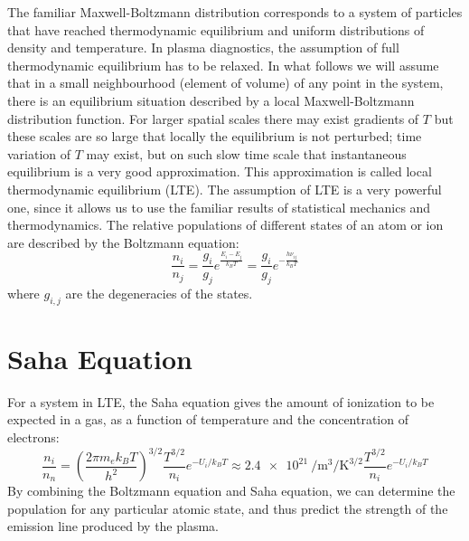 \documentclass[nofonts]{tufte-book}
\begin{document}
The familiar Maxwell-Boltzmann distribution corresponds to a system of particles that have reached thermodynamic equilibrium and uniform distributions of density and temperature. In plasma diagnostics, the assumption of full thermodynamic equilibrium has to be relaxed. In what follows we will assume that in a small neighbourhood (element of volume) of any point in the system, there is an equilibrium situation described by a local Maxwell-Boltzmann distribution function. For larger spatial scales there may exist gradients of $T$ but these scales are so large that locally the equilibrium is not perturbed; time variation of $T$ may exist, but on such slow time scale that instantaneous equilibrium is a very good approximation. This approximation is  called local thermodynamic equilibrium (LTE). The assumption of LTE is a very powerful one, since it allows us to use the familiar results of statistical mechanics and thermodynamics. The relative populations of different states of an atom or ion are described by the Boltzmann equation:
\begin{equation}
		\frac{n_i}{n_j}=\frac{g_i}{g_j}e^{\frac{E_i-E_j}{k_B T}}=\frac{g_i}{g_j}e^{-\frac{h\nu_{ij}}{k_B T}}
\end{equation}
where $g_{i,j}$ are the degeneracies of the states. 

\section{Saha Equation}\label{sec:saha}
For a system in LTE, the Saha equation gives the amount of ionization to be expected in a gas, as a function of temperature and the concentration of electrons:
\begin{equation}
		\frac{n_i}{n_n}= \left(\frac{2 \pi m_e k_B T}{h^2}\right)^{3/2}\frac{T^{3/2}}{n_i}e^{-U_i/k_B T} \approx \SI{2.4e21}{\per \metre\cubed \per\kelvin\tothe{3/2}} \frac{T^{3/2}}{n_i}e^{-U_i/k_B T}
\end{equation}
By combining the Boltzmann equation and Saha equation, we can determine the population for any particular atomic state, and thus predict the strength of the emission line produced by the plasma.
\end{document}
